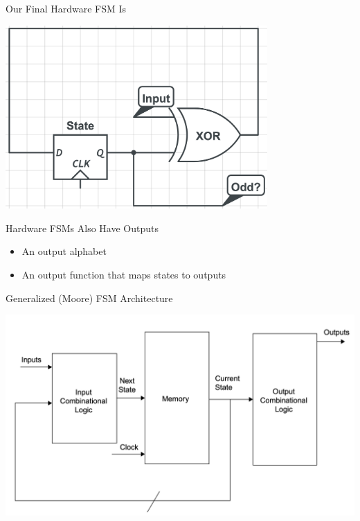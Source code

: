 \documentclass[aspectratio=169, 11pt, handout]{beamer}
\begin{document}
\begin{frame}{Our Final Hardware FSM Is}
    \begin{center}
        \includegraphics[width=0.75\textwidth]{Screen Shot 2022-09-25 at 02.09.53.png}
    \end{center}
\end{frame}

\begin{frame}{Hardware FSMs Also Have Outputs}
    \begin{itemize}
        \item An output alphabet
        \item An output function that maps states to outputs
    \end{itemize}
    
\end{frame}

\begin{frame}{Generalized (Moore) FSM Architecture}
    \begin{center}
        \includegraphics[width=\textwidth]{Screen Shot 2022-09-25 at 02.25.15.png}
    \end{center}
\end{frame}
\end{document}
